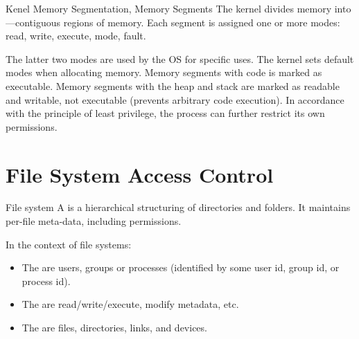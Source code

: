 \begin{dfnbox}{Kenel Memory Segmentation, Memory Segments}{}
    The kernel divides memory into ---contiguous regions of memory. Each segment is assigned one or more modes: read, write, execute, mode, fault.
\end{dfnbox}

The latter two modes are used by the OS for specific uses. The kernel sets default modes when allocating memory. Memory segments with code is marked as executable. Memory segments with the heap and stack are marked as readable and writable, not executable (prevents arbitrary code execution). In accordance with the principle of least privilege, the process can further restrict its own permissions.

\section{File System Access Control}

\begin{dfnbox}{File system}{}
    A  is a hierarchical structuring of directories and folders. It maintains per-file meta-data, including permissions.
\end{dfnbox}

In the context of file systems:
\begin{itemize}[noitemsep]
    \item The  are users, groups or processes (identified by some user id, group id, or process id).
    \item The  are read/write/execute, modify metadata, etc.
    \item The  are files, directories, links, and devices.
\end{itemize}


